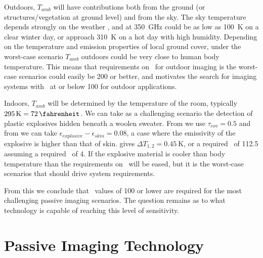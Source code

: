 Outdoors, $T_{amb}$ will have contributions both from the ground (or structures/vegetation at ground level) and from the sky.
The sky temperature depends strongly on the weather \cite{appleby_standoff_2007}, and at \SI{350}{\GHz} could be as low as \SI{100}{\K} on a clear winter day, or approach \SI{310}{\K} on a hot day with high humidity.
Depending on the temperature and emission properties of local ground cover, under the worst-case scenario $T_{amb}$ outdoors could be very close to human body temperature.
This means that requirements on \NETD\ for outdoor imaging is the worst-case scenarios could easily be \SI{200}{\mK} or better, and motivates the search for imaging systems with \NETD\ at or below \SI{100}{\mK} for outdoor applications. 

Indoors, $T_{amb}$ will be determined by the temperature of the room, typically $\SI{295}{\K} = \SI{72}{\fahrenheit}$.
We can take as a challenging scenario the detection of plastic explosives hidden beneath a woolen sweater.
From \cite{bjarnason_millimeter-wave_2004} we use $\tau_{cov} = 0.5$ and from \cite{appleby_standoff_2007} we can take $\epsilon_{explosive} - \epsilon_{skin} = 0.08$, a case where the emissivity of the explosive is higher than that of skin.
 gives $\Delta T_{1,2} = \SI{0.45}{\K}$, or a required \NETD\ of \SI{112.5}{\mK} assuming a required \SN\ of 4.
If the explosive material is cooler than body temperature than the requirements on \NETD\ will be eased, but it is the worst-case scenarios that should drive system requirements.

From this we conclude that \NETD\ values of \SI{100}{\mK} or lower are required for the most challenging passive imaging scenarios.
The question remains as to what technology is capable of reaching this level of sensitivity.

\section{Passive Imaging Technology}

